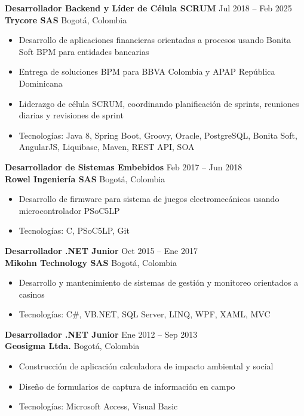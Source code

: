\documentclass[11pt,a4paper]{article}
\begin{document}
\vspace{6pt}

\textbf{Desarrollador Backend y L\'{i}der de C\'{e}lula SCRUM} \hfill Jul 2018 -- Feb 2025 \\
\textbf{Trycore SAS} \hfill Bogot\'{a}, Colombia
\begin{itemize}
    \item Desarrollo de aplicaciones financieras orientadas a procesos usando Bonita Soft BPM para entidades bancarias
    \item Entrega de soluciones BPM para BBVA Colombia y APAP Rep\'{u}blica Dominicana
    \item Liderazgo de c\'{e}lula SCRUM, coordinando planificaci\'{o}n de sprints, reuniones diarias y revisiones de sprint
    \item Tecnolog\'{i}as: Java 8, Spring Boot, Groovy, Oracle, PostgreSQL, Bonita Soft, AngularJS, Liquibase, Maven, REST API, SOA
\end{itemize}

\vspace{6pt}

\textbf{Desarrollador de Sistemas Embebidos} \hfill Feb 2017 -- Jun 2018 \\
\textbf{Rowel Ingenier\'{i}a SAS} \hfill Bogot\'{a}, Colombia
\begin{itemize}
    \item Desarrollo de firmware para sistema de juegos electromec\'{a}nicos usando microcontrolador PSoC5LP
    \item Tecnolog\'{i}as: C, PSoC5LP, Git
\end{itemize}

\vspace{6pt}

\textbf{Desarrollador .NET Junior} \hfill Oct 2015 -- Ene 2017 \\
\textbf{Mikohn Technology SAS} \hfill Bogot\'{a}, Colombia
\begin{itemize}
    \item Desarrollo y mantenimiento de sistemas de gesti\'{o}n y monitoreo orientados a casinos
    \item Tecnolog\'{i}as: C\#, VB.NET, SQL Server, LINQ, WPF, XAML, MVC
\end{itemize}

\vspace{6pt}

\textbf{Desarrollador .NET Junior} \hfill Ene 2012 -- Sep 2013 \\
\textbf{Geosigma Ltda.} \hfill Bogot\'{a}, Colombia
\begin{itemize}
    \item Construcci\'{o}n de aplicaci\'{o}n calculadora de impacto ambiental y social
    \item Dise\~{n}o de formularios de captura de informaci\'{o}n en campo
    \item Tecnolog\'{i}as: Microsoft Access, Visual Basic
\end{itemize}
\end{document}
